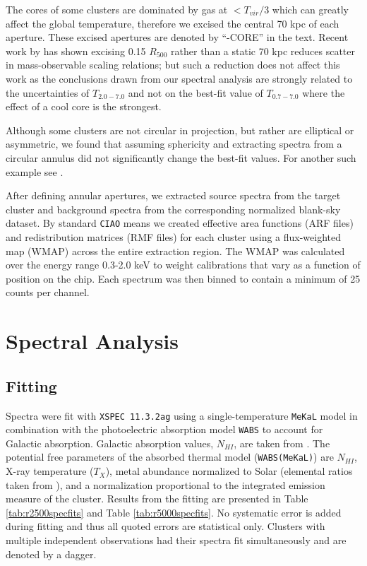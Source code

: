 \documentclass{emulateapj}
\begin{document}
The cores of some clusters are dominated by gas at $< T_{vir}/3$ which
can greatly affect the global temperature, therefore we excised the
central 70 kpc of each aperture. These excised apertures are denoted
by ``-CORE'' in the text. Recent work by \cite{2007astro.ph..3504M}
has shown excising 0.15 $R_{500}$ rather than a static 70 kpc reduces
scatter in mass-observable scaling relations; but such a reduction
does not affect this work as the conclusions drawn from our spectral
analysis are strongly related to the uncertainties of $T_{2.0-7.0}$
and not on the best-fit value of $T_{0.7-7.0}$ where the effect of a
cool core is the strongest.

Although some clusters are not circular in projection, but rather are
elliptical or asymmetric, we found that assuming sphericity and
extracting spectra from a circular annulus did not significantly
change the best-fit values. For another such example see
\cite{2005MNRAS.359.1481B}.

After defining annular apertures, we extracted source spectra from the
target cluster and background spectra from the corresponding
normalized blank-sky dataset. By standard {\tt CIAO} means we created
effective area functions (ARF files) and redistribution matrices (RMF
files) for each cluster using a flux-weighted map (WMAP) across the
entire extraction region. The WMAP was calculated over the energy
range 0.3-2.0 keV to weight calibrations that vary as a function of
position on the chip. Each spectrum was then binned to contain a
minimum of 25 counts per channel.

\section{Spectral Analysis} \label{sec:specan}

\subsection{Fitting} \label{sec:fitting}

Spectra were fit with {\tt XSPEC 11.3.2ag} \citep{1996ASPC..101...17A}
using a single-temperature {\tt MeKaL} model in combination with the
photoelectric absorption model {\tt WABS} \citep{1983ApJ...270..119M}
to account for Galactic absorption. Galactic absorption values,
$N_{HI}$, are taken from \cite{1990ARA&A..28..215D}. The potential
free parameters of the absorbed thermal model ({\tt WABS(MeKaL)}) are
$N_{HI}$, X-ray temperature ($T_{X}$), metal abundance normalized to Solar
(elemental ratios taken from \cite{1989GeCoA..53..197A}), and a
normalization proportional to the integrated emission measure of the
cluster. Results from the fitting are presented in Table
\ref{tab:r2500specfits} and Table \ref{tab:r5000specfits}. No
systematic error is added during fitting and thus all quoted errors
are statistical only. Clusters with multiple independent observations
had their spectra fit simultaneously and are denoted by a dagger.
\end{document}
